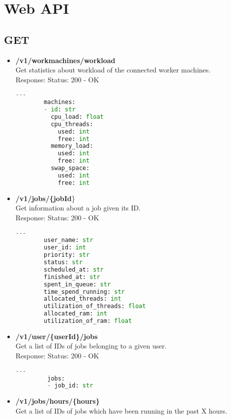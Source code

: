 \chapter{Web API}
  \section{GET}
    \begin{itemize}
      \item \textbf{/v1/workmachines/workload}\\
        Get statistics about workload of the connected worker machines.\\
        Response: Status: 200 - OK
        \begin{lstlisting}[language=Python, caption=Yaml response]
        ---
        machines:
        - id: str
          cpu_load: float
          cpu_threads:
            used: int
            free: int
          memory_load:
            used: int
            free: int
          swap_space:
            used: int
            free: int
        \end{lstlisting}
      \item \textbf{/v1/jobs/\{jobId}\}\\
       Get information about a job given its ID.\\
       Response: Status: 200 - OK
        \begin{lstlisting}[language=Python, caption=Yaml response]
        ---
        user_name: str
        user_id: int
        priority: str
        status: str
        scheduled_at: str
        finished_at: str
        spent_in_queue: str
        time_spend_running: str
        allocated_threads: int
        utilization_of_threads: float
        allocated_ram: int
        utilization_of_ram: float
        \end{lstlisting}
      \item \textbf{/v1/user/\{userId\}/jobs}\\
         Get a list of IDs of jobs belonging to a given user.\\
         Response: Status: 200 - OK
         \begin{lstlisting}[language=Python, caption=Yaml response]
         ---
         jobs:
         - job_id: str
         \end{lstlisting}
      \item \textbf{/v1/jobs/hours/\{hours\}}\\
         Get a list of IDs of jobs which have been running in the past X hours.\\

\end{itemize}
